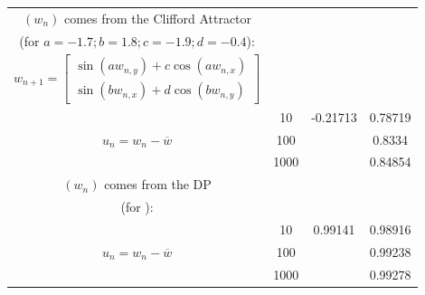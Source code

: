 \documentclass[a4paper,12pt,twoside]{report}
\begin{document}
\begin{center}
\begin{table}
{\begin{tabular}{|c|c| c c |}
          \hline
          $(w_n)$ comes from the Clifford Attractor \\ (for $a = -1.7; b = 1.8; c = -1.9; d = -0.4$): & & & \\
        {$w_{n+1}= \begin{bmatrix} \sin(aw_{n,y}) + c\cos(aw_{n,x}) \\ 
                                                                    \sin(bw_{n,x})+d\cos(bw_{n,y}) \end{bmatrix}$} & & & \\
          \multirow{3}{*}{$u_n = w_n-\overline{w}$}
              & 10 & -0.21713 & 0.78719 \\
              & 100 & &  0.8334 \\
              & 1000 & & 0.84854 \\
          \hline  
          \hline
          $(w_n)$ comes from the DP \\ (for ): & & & \\
          \multirow{3}{*}{$u_n = w_n-\overline{w}$}
                & 10 & 0.99141 & 0.98916\\
                & 100 & &  0.99238 \\
                & 1000 & & 0.99278 \\
          \hline        
      \end{tabular}} %


\end{table}
\end{center}
\end{document}
